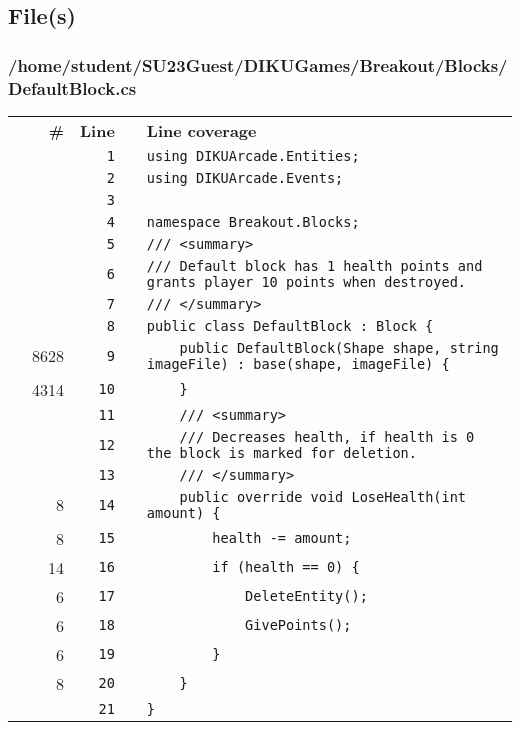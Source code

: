\documentclass[a4paper,landscape,10pt]{article}
\begin{document}
\subsection{File(s)}
\subsubsection{/home/student/SU23Guest/DIKUGames/Breakout/Blocks/DefaultBlock.cs}
\begin{longtable}[l]{lrrll}
\textbf{} & \textbf{\#} & \textbf{Line} & \textbf{} & \textbf{Line coverage}\\
\cellcolor{gray} &  & \verb~1~ & & \verb~using DIKUArcade.Entities;~\\
\cellcolor{gray} &  & \verb~2~ & & \verb~using DIKUArcade.Events;~\\
\cellcolor{gray} &  & \verb~3~ & & \verb~~\\
\cellcolor{gray} &  & \verb~4~ & & \verb~namespace Breakout.Blocks;~\\
\cellcolor{gray} &  & \verb~5~ & & \verb~/// <summary>~\\
\cellcolor{gray} &  & \verb~6~ & & \verb~/// Default block has 1 health points and grants player 10 points when destroyed.~\\
\cellcolor{gray} &  & \verb~7~ & & \verb~/// </summary>~\\
\cellcolor{gray} &  & \verb~8~ & & \verb~public class DefaultBlock : Block {~\\
\cellcolor{green} & 8628 & \verb~9~ & & \verb~    public DefaultBlock(Shape shape, string imageFile) : base(shape, imageFile) {~\\
\cellcolor{green} & 4314 & \verb~10~ & & \verb~    }~\\
\cellcolor{gray} &  & \verb~11~ & & \verb~    /// <summary>~\\
\cellcolor{gray} &  & \verb~12~ & & \verb~    /// Decreases health, if health is 0 the block is marked for deletion.~\\
\cellcolor{gray} &  & \verb~13~ & & \verb~    /// </summary>~\\
\cellcolor{green} & 8 & \verb~14~ & & \verb~    public override void LoseHealth(int amount) {~\\
\cellcolor{green} & 8 & \verb~15~ & & \verb~        health -= amount;~\\
\cellcolor{green} & 14 & \verb~16~ & & \verb~        if (health == 0) {~\\
\cellcolor{green} & 6 & \verb~17~ & & \verb~            DeleteEntity();~\\
\cellcolor{green} & 6 & \verb~18~ & & \verb~            GivePoints();~\\
\cellcolor{green} & 6 & \verb~19~ & & \verb~        }~\\
\cellcolor{green} & 8 & \verb~20~ & & \verb~    }~\\
\cellcolor{gray} &  & \verb~21~ & & \verb~}~\\
\end{longtable}
\newpage
\end{document}
